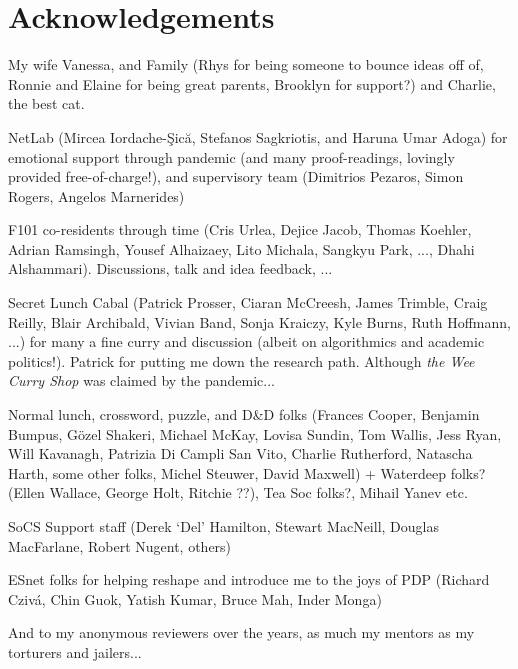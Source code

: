 \chapter*{Acknowledgements}

My wife Vanessa, and Family (Rhys for being someone to bounce ideas off of, Ronnie and Elaine for being great parents, Brooklyn for support?) and Charlie, the best cat.

NetLab (Mircea Iordache-\c{S}ic\u{a}, Stefanos Sagkriotis, and Haruna Umar Adoga) for emotional support through pandemic (and many proof-readings, lovingly provided free-of-charge!), and supervisory team (Dimitrios Pezaros, Simon Rogers, Angelos Marnerides)

F101 co-residents through time (Cris Urlea, Dejice Jacob, Thomas Koehler, Adrian Ramsingh, Yousef Alhaizaey, Lito Michala, Sangkyu Park, ..., Dhahi Alshammari). Discussions, talk and idea feedback, ...

Secret Lunch Cabal (Patrick Prosser, Ciaran McCreesh, James Trimble, Craig Reilly, Blair Archibald, Vivian Band, Sonja Kraiczy, Kyle Burns, Ruth Hoffmann, ...) for many a fine curry and discussion (albeit on algorithmics and academic politics!). Patrick for putting me down the research path. Although \emph{the Wee Curry Shop} was claimed by the pandemic...

Normal lunch, crossword, puzzle, and D\&D folks (Frances Cooper, Benjamin Bumpus, G\"{o}zel Shakeri, Michael McKay, Lovisa Sundin, Tom Wallis, Jess Ryan, Will Kavanagh, Patrizia Di Campli San Vito, Charlie Rutherford, Natascha Harth, some other folks, Michel Steuwer, David Maxwell) + Waterdeep folks? (Ellen Wallace, George Holt, Ritchie ??), Tea Soc folks?, Mihail Yanev etc.

SoCS Support staff (Derek `Del' Hamilton, Stewart MacNeill, Douglas MacFarlane, Robert Nugent, others)

ESnet folks for helping reshape and introduce me to the joys of PDP (Richard Cziv\'{a}, Chin Guok, Yatish Kumar, Bruce Mah, Inder Monga)

And to my anonymous reviewers over the years, as much my mentors as my torturers and jailers...